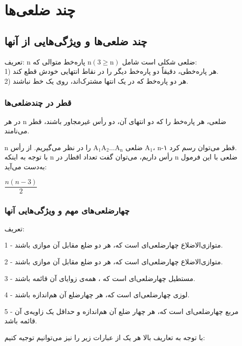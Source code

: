 \documentclass[12pt, a4paper]{book}
\begin{document}
\chapter{چند ضلعی‌ها}

\section{چند ضلعی‌ها و ویژگی‌هایی از آنها}

{\semibold تعریف:}
n
ضلعی شکلی است شامل 
$\text{n}(\mbox{3} \geq \text{n})$
پاره‌خط متوالی که:\\
1) هر پاره‌خطی، دقیقاً دو پاره‌خط دیگر را در نقاط انتهایی خودش قطع کند.\\
2) هر دو پاره‌خط که در یک انتها مشترک‌اند، روی یک خط نباشند.

\subsection{قطر در چندضلعی‌ها}

در هر
n
ضلعی، هر پاره‌خط را که دو انتهای آن، دو رأس غیرمجاور باشند، قطر می‌نامند.

n
ضلعی 
$\mbox{A}_{\mbox{1}}\mbox{A}_{\mbox{2}}\dots\mbox{A}_{\mbox{n}}$
 را در نظر می‌گیریم. از رأس 
$\mbox{A}_{\mbox{1}}$،
n-۱
قطر می‌توان رسم کرد.\\
با توجه به اینکه n رأس داریم، می‌توان گفت تعداد اقطار در n ضلعی با این فرمول به‌دست می‌آید:
\begin{minipage}{2 cm}
	\centering
	$\dfrac{n(n-3)}{2}$
\end{minipage}
\newline


\subsection{چهارضلعی‌های مهم و ویژگی‌هایی  آنها}
{\semibold تعریف:}


	1 -
	متوازی‌الاضلاع چهارضلعی‌ای است که، هر دو ضلع مقابل آن موازی باشند.
	
	2 -
متوازی‌الاضلاع چهارضلعی‌ای است که، هر دو ضلع مقابل آن موازی باشند.

	3 -
	مستطیل چهارضلعی‌ای است که ، همه‌ی زوایای آن قائمه باشند.
	
	4 -
	لوزی چهارضلعی‌ای است که، هر چهارضلع آن هم‌اندازه باشند.
	
	5 -
	مربع چهارضلعی‌ای است که، هر چهار ضلع آن هم‌اندازه و حداقل یک زاویه‌ی آن قائمه باشد.

با توجه به تعاریف بالا هر یک از عبارات زیر را نیز می‌توانیم توجیه کنیم: 
\end{document}
